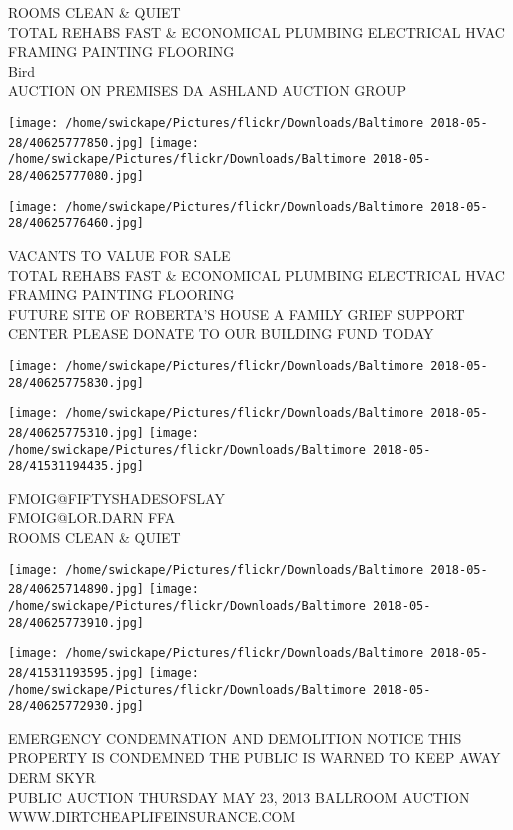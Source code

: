\documentclass[10pt,letterpaper]{article}
\begin{document}
ROOMS CLEAN \& QUIET\\
TOTAL REHABS FAST \& ECONOMICAL PLUMBING ELECTRICAL HVAC FRAMING PAINTING FLOORING\\
Bird\\
AUCTION ON PREMISES DA ASHLAND AUCTION GROUP
\pagebreak

\texttt{[image: /home/swickape/Pictures/flickr/Downloads/Baltimore 2018-05-28/40625777850.jpg]}
\texttt{[image: /home/swickape/Pictures/flickr/Downloads/Baltimore 2018-05-28/40625777080.jpg]}

\texttt{[image: /home/swickape/Pictures/flickr/Downloads/Baltimore 2018-05-28/40625776460.jpg]}

VACANTS TO VALUE FOR SALE\\
TOTAL REHABS FAST \& ECONOMICAL PLUMBING ELECTRICAL HVAC FRAMING PAINTING FLOORING\\
FUTURE SITE OF ROBERTA'S HOUSE A FAMILY GRIEF SUPPORT CENTER PLEASE DONATE TO OUR BUILDING FUND TODAY
\pagebreak

\texttt{[image: /home/swickape/Pictures/flickr/Downloads/Baltimore 2018-05-28/40625775830.jpg]}

\vspace{0.25in}
\texttt{[image: /home/swickape/Pictures/flickr/Downloads/Baltimore 2018-05-28/40625775310.jpg]}
\texttt{[image: /home/swickape/Pictures/flickr/Downloads/Baltimore 2018-05-28/41531194435.jpg]}

FMOIG@FIFTYSHADESOFSLAY\\
FMOIG@LOR.DARN FFA\\
ROOMS CLEAN \& QUIET
\pagebreak

\texttt{[image: /home/swickape/Pictures/flickr/Downloads/Baltimore 2018-05-28/40625714890.jpg]}
\texttt{[image: /home/swickape/Pictures/flickr/Downloads/Baltimore 2018-05-28/40625773910.jpg]}

\texttt{[image: /home/swickape/Pictures/flickr/Downloads/Baltimore 2018-05-28/41531193595.jpg]}
\texttt{[image: /home/swickape/Pictures/flickr/Downloads/Baltimore 2018-05-28/40625772930.jpg]}

EMERGENCY CONDEMNATION AND DEMOLITION NOTICE THIS PROPERTY IS CONDEMNED THE PUBLIC IS WARNED TO KEEP AWAY\\
DERM SKYR\\
PUBLIC AUCTION THURSDAY MAY 23, 2013 BALLROOM AUCTION\\
WWW.DIRTCHEAPLIFEINSURANCE.COM
\pagebreak
\end{document}
